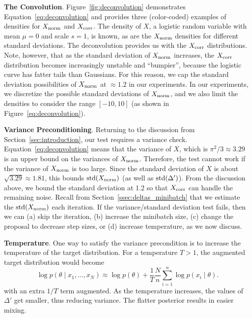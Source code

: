 \documentclass{article}
\begin{document}
\textbf{The Convolution}. Figure~\ref{fig:deconvolution} demonstrates
Equation~\ref{eq:deconvolution} and provides three (color-coded) examples of densities for $X_{\rm
norm}$ and $X_{\rm corr}$. The density of $X$, a logistic random variable with mean $\mu = 0$ and
scale $s=1$, is known, as are the $X_{\rm norm}$ densities for different standard deviations. The
deconvolution provides us with the $X_{\rm corr}$ distributions. Note, however, that as the standard
deviation of $X_{\rm norm}$ increases, the $X_{\rm corr}$ distribution becomes increasingly unstable
and ``bumpier'', because the logistic curve has fatter tails than Gaussians. For this reason, we cap
the standard deviation possibilities of $X_{\rm norm}$ at $\approx 1.2$ in our experiments. In our
experiments, we discretize the possible standard deviations of $X_{\rm norm}$, and we also limit the
densities to consider the range $[-10,10]$ (as shown in Figure~\ref{eq:deconvolution}).

\textbf{Variance Preconditioning}. Returning to the discussion from Section~\ref{sec:introduction},
our test requires a variance check. Equation~\ref{eq:deconvolution} means that the variance of $X$,
which is $\pi^2/3\approx 3.29$ is an upper bound on the variances of $X_{\rm norm}$. Therefore, the
test cannot work if the variance of $X_{\rm norm}$ is too large. Since the standard deviation of $X$
is about $\sqrt{3.29}\approx 1.81$, this bounds ${\rm std}(X_{\rm norm})$ (as well as ${\rm
std}(\Delta')$). From the discussion above, we bound the standard deviation at 1.2 so that $X_{\rm
corr}$ can handle the remaining noise. Recall from Section~\ref{ssec:deltas_minibatch} that we
estimate the ${\rm std}(X_{\rm norm})$ each iteration. If the variance/standard deviation test
fails, then we can (a) skip the iteration, (b) increase the minibatch size, (c) change the proposal
to decrease step sizes, or (d) increase temperature, as we now discuss.

\textbf{Temperature}. One way to satisfy the variance precondition is to increase the temperature of
the target distribution. For a temperature $T>1$, the augmented target distribution would become
\begin{equation}\label{eq:log_temperature}
\log p(\theta \mid x_1,\ldots,x_N) \approx \log p(\theta) + \frac{1}{T}\frac{N}{n} \sum_{i=1}^n\log p(x_i \mid \theta).
\end{equation}
with an extra $1/T$ term augmented. As the temperature increases, the values of $\Delta'$ get
smaller, thus reducing variance. The flatter posterior results in easier mixing.
\end{document}
